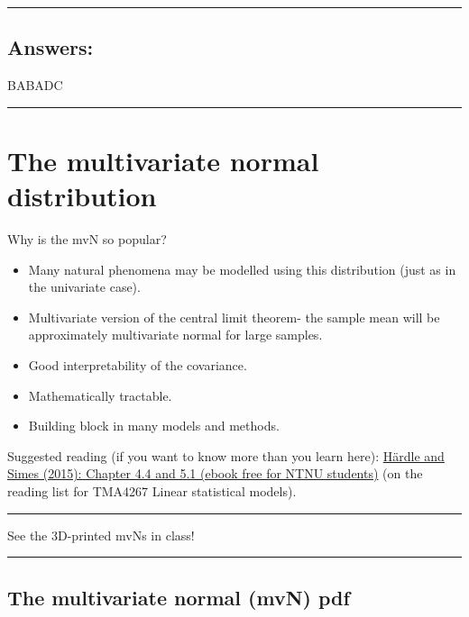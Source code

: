 \documentclass[]{article}
\providecommand{\tightlist}{%
  \setlength{\itemsep}{0pt}\setlength{\parskip}{0pt}}
\begin{document}
\begin{center}\rule{0.5\linewidth}{\linethickness}\end{center}

\hypertarget{answers}{%
\subsection{Answers:}\label{answers}}

BABADC

\begin{center}\rule{0.5\linewidth}{\linethickness}\end{center}

\hypertarget{the-multivariate-normal-distribution}{%
\section{The multivariate normal
distribution}\label{the-multivariate-normal-distribution}}

Why is the mvN so popular?

\begin{itemize}
\tightlist
\item
  Many natural phenomena may be modelled using this distribution (just
  as in the univariate case).
\item
  Multivariate version of the central limit theorem- the sample mean
  will be approximately multivariate normal for large samples.
\item
  Good interpretability of the covariance.
\item
  Mathematically tractable.
\item
  Building block in many models and methods.
\end{itemize}

Suggested reading (if you want to know more than you learn here):
\href{https://link.springer.com/book/10.1007/978-3-540-72244-1}{Härdle
and Simes (2015): Chapter 4.4 and 5.1 (ebook free for NTNU students)}
(on the reading list for TMA4267 Linear statistical models).

\begin{center}\rule{0.5\linewidth}{\linethickness}\end{center}

See the 3D-printed mvNs in class!

\begin{center}\rule{0.5\linewidth}{\linethickness}\end{center}

\hypertarget{the-multivariate-normal-mvn-pdf}{%
\subsection{The multivariate normal (mvN)
pdf}\label{the-multivariate-normal-mvn-pdf}}
\end{document}
